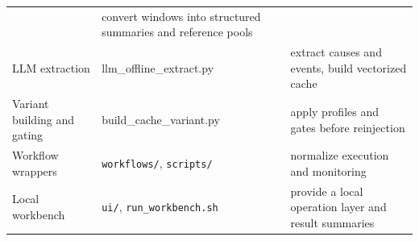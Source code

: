 \documentclass[
  11pt,
  a4paper]{article}
\begin{document}
\begin{longtable}[]{@{}lll@{}}
\begin{minipage}[t]{0.30\columnwidth}
\end{minipage} & \begin{minipage}[t]{0.30\columnwidth}\raggedright
convert windows into structured summaries and reference pools\strut
\end{minipage}\tabularnewline
\begin{minipage}[t]{0.30\columnwidth}\raggedright
LLM extraction\strut
\end{minipage} & \begin{minipage}[t]{0.30\columnwidth}\raggedright
llm\_offline\_extract.py\strut
\end{minipage} & \begin{minipage}[t]{0.30\columnwidth}\raggedright
extract causes and events, build vectorized cache\strut
\end{minipage}\tabularnewline
\begin{minipage}[t]{0.30\columnwidth}\raggedright
Variant building and gating\strut
\end{minipage} & \begin{minipage}[t]{0.30\columnwidth}\raggedright
build\_cache\_variant.py\strut
\end{minipage} & \begin{minipage}[t]{0.30\columnwidth}\raggedright
apply profiles and gates before reinjection\strut
\end{minipage}\tabularnewline
\begin{minipage}[t]{0.30\columnwidth}\raggedright
Workflow wrappers\strut
\end{minipage} & \begin{minipage}[t]{0.30\columnwidth}\raggedright
\texttt{workflows/}, \texttt{scripts/}\strut
\end{minipage} & \begin{minipage}[t]{0.30\columnwidth}\raggedright
normalize execution and monitoring\strut
\end{minipage}\tabularnewline
\begin{minipage}[t]{0.30\columnwidth}\raggedright
Local workbench\strut
\end{minipage} & \begin{minipage}[t]{0.30\columnwidth}\raggedright
\texttt{ui/}, \texttt{run\_workbench.sh}\strut
\end{minipage} & \begin{minipage}[t]{0.30\columnwidth}\raggedright
provide a local operation layer and result summaries\strut
\end{minipage}\tabularnewline
\bottomrule
\end{longtable}
\end{document}
